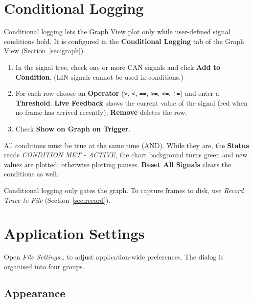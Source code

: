 \documentclass[a4paper,11pt]{article}
\newcommand{\menu}[1]{\textit{#1}}
\newcommand{\ui}[1]{\textbf{#1}}
\begin{document}
\section{Conditional Logging}

Conditional logging lets the Graph View plot only while user-defined signal
conditions hold. It is configured in the \ui{Conditional Logging} tab of the Graph
View (Section~\ref{sec:graph}).

\begin{enumerate}
  \item In the signal tree, check one or more CAN signals and click
        \ui{Add to Condition}. (LIN signals cannot be used in conditions.)
  \item For each row choose an \ui{Operator} (\texttt{>}, \texttt{<}, \texttt{==},
        \texttt{>=}, \texttt{<=}, \texttt{!=}) and enter a \ui{Threshold}.
        \ui{Live Feedback} shows the current value of the signal (red when no
        frame has arrived recently); \ui{Remove} deletes the row.
  \item Check \ui{Show on Graph on Trigger}.
\end{enumerate}

All conditions must be true at the same time (AND). While they are, the
\ui{Status} reads \textit{CONDITION MET - ACTIVE}, the chart background turns green
and new values are plotted; otherwise plotting pauses. \ui{Reset All Signals}
clears the conditions as well.

\begin{notebox}
Conditional logging only gates the graph. To capture frames to disk, use
\menu{Record Trace to File} (Section~\ref{sec:record}).
\end{notebox}

\section{Application Settings}

Open \menu{File \textrightarrow{} Settings\ldots} to adjust application-wide
preferences. The dialog is organised into four groups.

\subsection*{Appearance}
\end{document}
